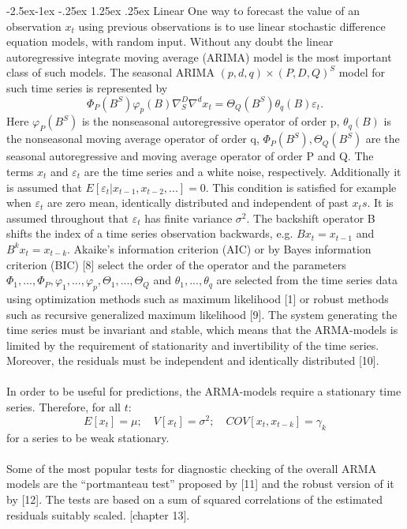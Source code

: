 \documentclass[runningheads,a4paper]{llncs}[2015/06/24]
\makeatletter
\renewcommand\paragraph{\@startsection{paragraph}{4}{\z@}%
            {-2.5ex\@plus -1ex \@minus -.25ex}%
            {1.25ex \@plus .25ex}%
            {\normalfont\normalsize\bfseries}}
\makeatother
\begin{document}
\paragraph{Linear}
One way to forecast the value of an observation $x_t$ using previous observations is to use linear stochastic difference equation models, with random input. Without any doubt the linear autoregressive integrate moving average (ARIMA) model is the most important class of such models. The seasonal ARIMA $(p, d, q) × (P, D, Q)^S$ model for such time series is represented by
\begin{equation}
Φ_P (B^S)φ_p(B)∇^D_S ∇^d x_t = Θ_Q(B^S)θ_q (B)ε_t.
\end{equation}
Here $φ_P (B^S)$ is the nonseasonal autoregressive operator of order p, $θ_q (B)$ is the nonseasonal moving average operator of order q, $Φ_P (B^S), Θ_Q(B^S)$ are the seasonal autoregressive and moving average operator of order P and Q. The terms $x_t$ and $ε_t$ are the time series and a white noise, respectively. Additionally it is assumed that $E[ε_t|x_{t−1}, x_{t−2},...] = 0$. This condition is satisfied for example when $ε_t$ are
zero mean, identically distributed and independent of past $x_ts$. It is assumed throughout that $ε_t$ has finite variance $σ^2$. The backshift operator B shifts the index of a time series observation backwards,  e.g. $Bx_t = x_{t−1}$ and $B^k x_t = x_{t−k}$. Akaike’s information criterion (AIC) or by Bayes information criterion (BIC) [8] select the order of the operator and the parameters $Φ_1,...,Φ_P , φ_1,...,φ_p, Θ_1,...,Θ_Q$ and $θ_1,...,θ_q$ are selected from the time series data using optimization methods such as maximum likelihood [1] or  robust methods such as recursive generalized maximum likelihood [9]. The system generating the time series must be invariant and stable, which means that the ARMA-models is limited by the requirement of stationarity and invertibility of the time series. Moreover, the residuals must be independent and identically distributed [10]. \\\\In order to be useful for predictions, the ARMA-models require a stationary time series. Therefore, for all $t$:
\begin{equation}
E[x_t] = μ; \quad V[x_t] = σ^2; \quad COV[x_t, x_{t−k} ] = γ_k 
\end{equation}
for a series to be weak stationary.
\\\\Some of the most popular tests for diagnostic checking of the overall ARMA models are the \enquote{portmanteau test} proposed by [11] and the robust version of it by [12]. The tests are based on a sum of squared correlations of the estimated residuals suitably scaled. [chapter 13]. 
\end{document}
